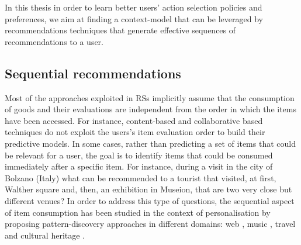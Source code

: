 In this thesis in order to learn better users' action selection policies and preferences, we aim at finding a context-model that can be leveraged by recommendations techniques that generate effective sequences of recommendations to a user.

\subsection{Sequential recommendations}
\label{sec:sequentialrecommendation}
Most of the approaches exploited in RSs implicitly assume that the consumption of 
goods and their evaluations are independent from the order in which the items have been accessed. 
For instance, content-based and collaborative based techniques do not exploit the users's item evaluation order to build their predictive models.
In some cases, rather than predicting a set of items that could be relevant for a user, the goal is to identify items that could be consumed immediately after a specific item. For instance, during a visit in the city of Bolzano (Italy) what can be recommended to a tourist that visited, at first, Walther square and, then, an exhibition in Museion, that are two very close but different venues?
In order to address this type of questions, the sequential aspect of item consumption 
has been studied in the context of personalisation by proposing pattern-discovery approaches in different domains: web \cite{mobasher:2002}, music \cite{hariri2012, jannach2017}, travel \cite{zhang:seq:travel:2014,flikr_tourism_RS:muntean:2015,palumbo:2017} and cultural heritage \cite{hashemi:2017}. 

